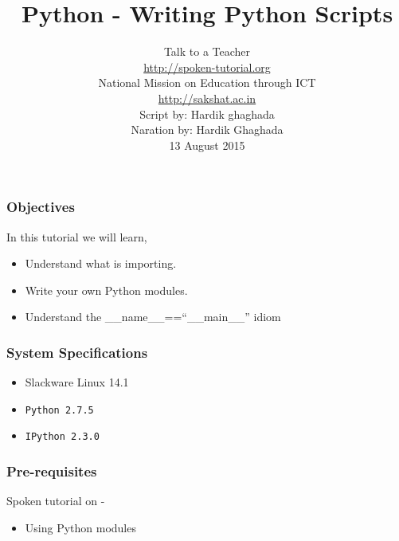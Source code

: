 \documentclass[17pt,compress]{beamer}
\author[FOSSEE]{}
\institute[IIT Bombay]{}
\date[]{}
\begin{document}
\sffamily \bfseries
\title
[Writing Python Scripts]
{Python - Writing Python Scripts}
\author
[FOSSEE, IIT - Bombay]
{\small Talk to a Teacher\\{\color{blue}\url{http://spoken-tutorial.org}}\\National Mission on Education
 through ICT\\{\color{blue}\url{http://sakshat.ac.in}} \\[0.5cm]{\tiny Script by: Hardik ghaghada \\ Naration by: Hardik Ghaghada \\ 13 August 2015}}

\begin{frame}
   \titlepage
\end{frame}
\begin{frame}
\frametitle{Objectives}
\label{sec-2}

  In this tutorial we will learn, \pause 


\begin{itemize}
\item Understand what is importing.\pause
\item Write your own Python modules.\pause
\item Understand the \_\_name\_\_==``\_\_main\_\_'' idiom
\end{itemize}
\end{frame}
\begin{frame}
\frametitle{System Specifications}\pause
\begin{itemize}
\item Slackware Linux 14.1\pause
\item \texttt{Python 2.7.5} \pause
\item \texttt{IPython 2.3.0}
\end{itemize}
\end{frame}
\begin{frame}
\frametitle{Pre-requisites}
\label{sec-3}

Spoken tutorial on -

\begin{itemize}
\item Using Python modules
\end{itemize}
\end{frame}
\end{document}
